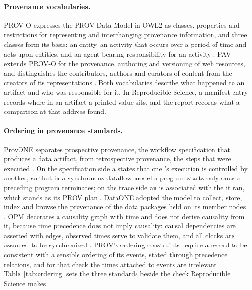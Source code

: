 \paragraph{Provenance vocabularies.} PROV-O expresses the PROV Data Model in OWL2 as classes,
properties and restrictions for representing and interchanging provenance information, and three
classes form its basis: an entity, an activity that occurs over a period of time and acts upon
entities, and an agent bearing responsibility for an activity \citep{lebo2013provo}. PAV extends
PROV-O for the provenance, authoring and versioning of web resources, and distinguishes the
contributors, authors and curators of content from the creators of its representations
\citep{ciccarese2013pav}. Both vocabularies describe what happened to an artifact and who was
responsible for it. In Reproducible Science, a manifest entry records where in an artifact a printed value
sits, and the report records what a comparison at that address found.

\paragraph{Ordering in provenance standards.} ProvONE separates prospective provenance, the
workflow specification that produces a data artifact, from retrospective provenance, the steps
that were executed \citep{cuevasvicenttin2016provone}. On the specification side a
 states that one 's execution is controlled by another, so that in a
synchronous dataflow model a program starts only once a preceding program terminates; on the trace
side an  is associated with the  it ran, which stands as its PROV plan
\citep{cuevasvicenttin2016provone}. DataONE adopted the model to collect, store, index and browse
the provenance of the data packages held on its member nodes \citep{cao2016provone}. OPM decorates
a causality graph with time and does not derive causality from it, because time precedence does
not imply causality: causal dependencies are asserted with edges, observed times serve to validate
them, and all clocks are assumed to be synchronized \citep{moreau2011opm}. PROV's ordering
constraints require a record to be consistent with a sensible ordering of its events, stated
through precedence relations, and for that check the times attached to events are irrelevant
\citep{cheney2013provconstraints}. Table~\ref{tab:ordering} sets the three standards beside the
check Reproducible Science makes.

